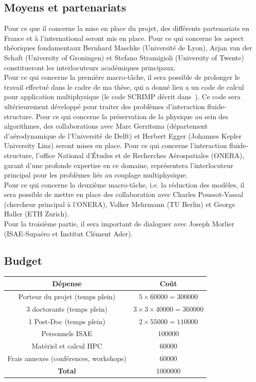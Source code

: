 \documentclass[12pt, french]{article}
\begin{document}
\subsection{Moyens et partenariats}
Pour ce que il concerne la mise en place du projet, des différents partenariats en France et \`a l'international seront mis en place. Pour ce qui concerne les aspect théoriques fondamentaux Bernhard Maschke (Universit\'e de Lyon), Arjan van der Schaft (University of Groningen) et Stefano Stramigioli (University of Twente) constitueront les interlocuteurs académiques principaux. \\

Pour ce qui concerne la première macro-tâche, il sera possible de prolonger le travail effectué dans le cadre de ma thèse, qui a donn\'e lieu a un code de calcul pour application multiphysique (le code SCRIMP décrit dans~\cite{brugnoli2021num}). Ce code sera ultérieurement développé pour traiter des problèmes d'interaction fluide-structure. Pour ce qui concerne la préservation de la physique au sein des algorithmes, des collaborations avec Marc Gerritsma (département d'aérodynamique de l'Universit\'e de Delft) et Herbert Egger (Johannes Kepler University Linz) seront mises en place. Pour ce qui concerne l'interaction fluide-structure, l'office National d'Études et de Recherches Aérospatiales (ONERA), garant d'une profonde expertise en ce domaine, représentera l'interlocuteur principal pour les problèmes liés au couplage multiphysique. 
\\


Pour ce qui concerne la deuxième macro-tâche, i.e. la réduction des modèles, il sera possible de mettre en place des collaboration avec Charles Poussot-Vassal (chercheur principal \`a l'ONERA),  Volker Mehrmann (TU Berlin) et George Haller (ETH Zurich). \\

Pour la troisième partie, il sera important de dialoguer avec Joseph Morlier (ISAE-Supa\'ero et Institut Clément Ader).


\subsection{Budget}
\begin{center}
\begin{tabular}{|c|c|}
	\hline
	D\'epense & Co\^{u}t \\
	\hline
	Porteur du projet (temps plein) & $5\times 60000=300000$ \\
	3 doctorants (temps plein) & $3\times 3\times 40000=360000$  \\
	1 Post-Doc (temps plein) & $2\times 55000=110000$ \\
	Personnels ISAE & $100000$ \\
	Matériel  et calcul HPC & $60000$ \\
	Frais annexes (conférences, workshops) & $60000$ \\
	\hline
	\textbf{Total} & 1000000 \\
	\hline
\end{tabular}
\end{center}



\footnotesize


\end{document}
